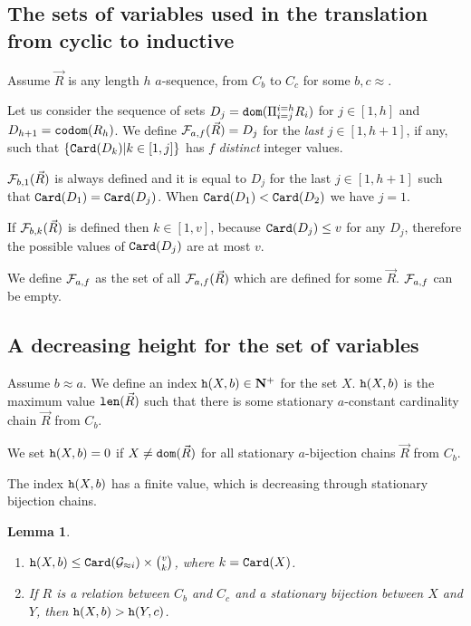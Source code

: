 \documentclass{lmcs}
\newtheorem{lemma}[theorem]{Lemma}
\begin{document}
\subsection{The sets of variables used in the translation from cyclic to inductive}
Assume $\vec{R}$ is any length $h$ $a$-sequence, from $C_b$ to $C_c$ 
for some $b,c \approx $.

Let us consider the sequence of sets $D_j = {\tt dom}(\Pi_{i=j}^{i=h} R_i)$
for $j \in [1,h]$ and $D_{h+1} = {\tt codom}(R_h)$. 
We define ${\mathcal F}_{a,f}(\vec{R}) = D_j$ 
for the \emph{last} $j \in [1,h+1]$, if any, such that
$\{{\tt Card}(D_k) | k \in [1,j]  \}$ has $f$ \emph{distinct} integer values. 

${\mathcal F}_{b,1}(\vec{R}) $ is always defined and it is equal to $D_j$
for the last $j \in [1,h+1]$ such that 
${\tt Card}(D_1) = {\tt Card}(D_j)$. When ${\tt Card}(D_1) < {\tt Card}(D_2)$ we have $j=1$.

If ${\mathcal F}_{b,k}(\vec{R})$ is defined then $k \in [1,v]$, because
${\tt Card}(D_j) \le v$ for any $D_j$,
therefore the possible values of ${\tt Card}(D_j)$ are at most $v$.

We define ${\mathcal F}_{a,f}$ as the set of all ${\mathcal F}_{a,f}(\vec{R})$ which are defined
for some $\vec{R}$. ${\mathcal F}_{a,f}$ can be empty.


\subsection{A decreasing height for the set of variables}
Assume $b \approx a$.
We define an index ${\tt h}(X,b) \in {\bf N}^+$ for the set $X$. 
${\tt h}(X,b)$ is the maximum value 
${\mbox{\tt len}}(\vec{R})$ such that there is some stationary 
$a$-constant cardinality chain $\vec{R}$ from $C_b$.

We set ${\tt h}(X,b)=0$ if $X \not = {\tt dom}(\vec {R})$ for all stationary $a$-bijection chains 
$\vec {R}$ from $C_b$.

The index ${\tt h}(X,b)$ has a finite value, which is decreasing through stationary bijection chains.


\begin{lemma} 
\begin{enumerate}
\item
$\height(X,b) \le \Card(\setG_{\approx i}) \times \newton{v}{k}$, where 
$k = {\tt Card}(X)$.
\item
If $R$ is a relation between $C_b$ and $C_c$ and a stationary bijection between
$X$ and $Y$, then ${\tt h}(X,b) > {\tt h}(Y,c)$. 
\end{enumerate}
\end{lemma}
\end{document}
